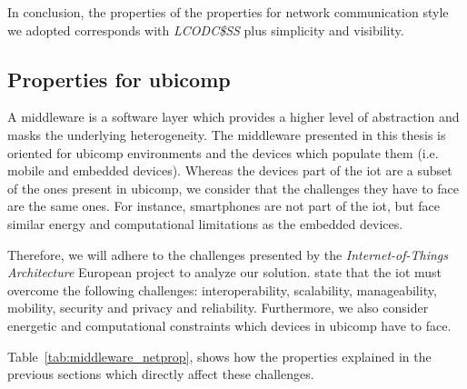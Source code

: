 In conclusion, the properties of the properties for network communication style we adopted corresponds with \emph{LCODC\$SS} plus simplicity and visibility. %





\subsection{Properties for \acs{ubicomp}}
\label{sec:middleware_properties}

A middleware is a software layer which provides a higher level of abstraction and masks the underlying heterogeneity.
The middleware presented in this thesis is oriented for \ac{ubicomp} environments and the devices which populate them (i.e. mobile and embedded devices).
Whereas the devices part of the \ac{iot} are a subset of the ones present in \ac{ubicomp}, we consider that the challenges they have to face are the same ones.
For instance, smartphones are not part of the \ac{iot}, but face similar energy and computational limitations as the embedded devices. %

Therefore, we will adhere to the challenges presented by the \emph{Internet-of-Things Architecture} European project \citep{walewski_project_2011} to analyze our solution.
\citeauthor{walewski_project_2011} state that the \ac{iot} must overcome the following challenges:
interoperability, scalability, manageability, mobility, security and privacy and reliability.
Furthermore, we also consider energetic and computational constraints which devices in \ac{ubicomp} have to face. %


Table~\ref{tab:middleware_netprop}, shows how the properties explained in the previous sections which directly affect these challenges.








